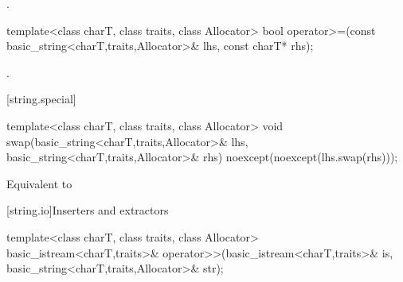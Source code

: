 \begin{itemdescr}
\pnum
\returns
{}.
\end{itemdescr}

%
%
\begin{itemdecl}
template<class charT, class traits, class Allocator>
  bool operator>=(const basic_string<charT,traits,Allocator>& lhs,
                  const charT* rhs);
\end{itemdecl}

\begin{itemdescr}
\pnum
\returns
{}.
\end{itemdescr}

[string.special]{}

%
%
\begin{itemdecl}
template<class charT, class traits, class Allocator>
  void swap(basic_string<charT,traits,Allocator>& lhs,
            basic_string<charT,traits,Allocator>& rhs)
    noexcept(noexcept(lhs.swap(rhs)));
\end{itemdecl}

\begin{itemdescr}
\pnum
\effects
Equivalent to 
\end{itemdescr}

[string.io]{Inserters and extractors}

%
%
\begin{itemdecl}
template<class charT, class traits, class Allocator>
  basic_istream<charT,traits>&
    operator>>(basic_istream<charT,traits>& is,
               basic_string<charT,traits,Allocator>& str);
\end{itemdecl}

